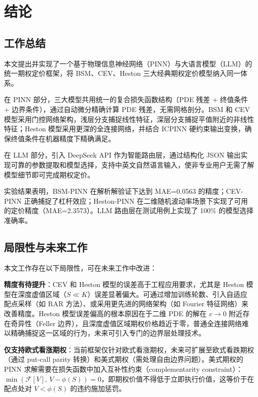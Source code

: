 \chapter{结论}\label{chap:conclusion}

\section{工作总结}\label{sec:summary}

本文提出并实现了一个基于物理信息神经网络（PINN）与大语言模型（LLM）的统一期权定价框架，将 BSM、CEV、Heston 三大经典期权定价模型纳入同一体系。

在 PINN 部分，三大模型共用统一的复合损失函数结构（PDE 残差 + 终值条件 + 边界条件），通过自动微分精确计算 PDE 残差，无需网格剖分。BSM 和 CEV 模型采用门控网络架构，浅层分支捕捉线性特征，深层分支捕捉平值附近的非线性特征；Heston 模型采用更深的全连接网络，并结合 ICPINN 硬约束输出变换，确保终值条件在机器精度下精确满足。

在 LLM 部分，引入 DeepSeek API 作为智能路由层，通过结构化 JSON 输出实现可靠的参数提取和模型选择，支持中英文自然语言输入，使非专业用户无需了解模型细节即可完成期权定价。

实验结果表明，BSM-PINN 在解析解验证下达到 MAE=0.0563 的精度；CEV-PINN 正确捕捉了杠杆效应；Heston-PINN 在二维随机波动率场景下实现了可用的定价精度（MAE=2.3573）。LLM 路由层在测试用例上实现了 100\% 的模型选择准确率。

\section{局限性与未来工作}\label{sec:future}

本文工作存在以下局限性，可在未来工作中改进：

\textbf{精度有待提升}：CEV 和 Heston 模型的误差高于工程应用要求，尤其是 Heston 模型在深度虚值区域（$S \ll K$）误差显著偏大。可通过增加训练轮数、引入自适应配点采样（如 RAR 方法）、或采用更先进的网络架构（如 Fourier 特征网络）来改善精度。Heston 模型误差偏高的根本原因在于二维 PDE 的解在 $v \to 0$ 附近存在奇异性（Feller 边界），且深度虚值区域期权价格趋近于零，普通全连接网络难以精确捕捉这一区域的行为，未来可引入专门的边界层处理技术。

\textbf{仅支持欧式看涨期权}：当前框架仅针对欧式看涨期权，未来可扩展至欧式看跌期权（通过 put-call parity 转换）和美式期权（需处理自由边界问题）。美式期权的 PINN 求解需要在损失函数中加入互补性约束（complementarity constraint）：$\min(\mathcal{F}[V],\, V - \phi(S)) = 0$，即期权价值不得低于立即执行价值，这等价于在配点处对 $V < \phi(S)$ 的违约施加惩罚。

